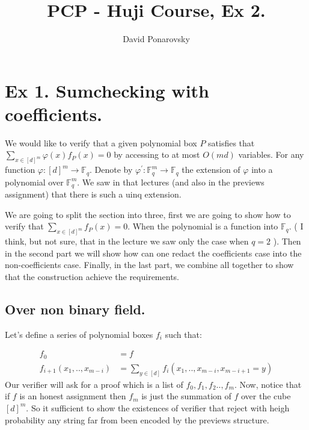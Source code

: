 \documentclass{article}
\title{PCP - Huji Course, Ex 2.}
\author{David Ponarovsky}
\newcommand{\FF}{\mathbb{F}_{q}}
\begin{document}
\maketitle

\section{Ex 1. Sumchecking with coefficients.}

We would like to verify that a given polynomial box $P$ satisfies that $ \sum_{x\in [d]^{m}}{ \varphi\left( x \right) f_{P}\left( x \right) } = 0 $  by accessing to at most $O\left(md\right)$ variables. For any function $\varphi : [d]^{m} \rightarrow \FF$. Denote by $\varphi^{\prime} : \FF^{m} \rightarrow \FF$ the extension of $\varphi$ into a polynomial over $\FF^{m}$. We saw in that lectures (and also in the previews assignment) that there is such a uinq extension. 

We are going to split the section into three, first we are going to show how to verify that $\sum_{x \in [d]^{m}}{ f_{P}\left( x \right) } = 0 $. When the polynomial is a function into $\FF$. ( I think, but not sure, that in the lecture we saw only the case when $q = 2$ ). Then in the second part we will show how can one redact the coefficients case into the non-coefficients case. Finally, in the last part, we combine all together to show that the construction achieve the requirements. 


\subsection{Over non binary field. } Let's define a series of polynomial boxes $f_{i}$ such that: 

\begin{equation*}
  \begin{split}
    f_{0} & = f \\ 
  f_{i+1} \left( x_{1}, .. , x_{m-i} \right) & = \sum_{y \in [d] } f_{i}\left(x_{1}, .. , x_{m-i}, x_{m-i+1} = y \right)
  \end{split}
\end{equation*}
Our verifier will ask for a proof which is a list of $f_{0}, f_{1}, f_{2} .., f_{m}$. Now, notice that if $f$ is an honest assignment then $f_{m}$ is just the summation of $f$ over the cube $[d]^{m}$. So it sufficient to show the existences of verifier that reject with heigh probability any string far from been encoded by the previews structure.
\end{document}
